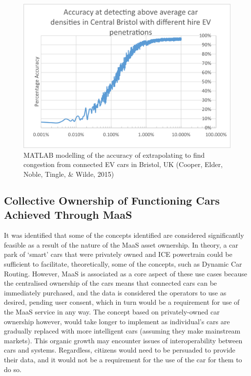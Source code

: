 \documentclass[journal]{IEEEtran}
\begin{document}
\begin{figure}[!htb]
\centering
\includegraphics[width=\columnwidth]{images/criticalresolution.png}
\caption{MATLAB modelling of the accuracy of extrapolating to find
  congestion from connected EV cars in Bristol, UK (Cooper, Elder,
  Noble, Tingle, \& Wilde, 2015)}
\label{fig:criticalresolution}
\end{figure}

\subsection{Collective Ownership of Functioning Cars Achieved Through
  MaaS}

It was identified that some of the concepts identified are considered
significantly feasible as a result of the nature of the MaaS asset
ownership. In theory, a car park of `smart' cars that were privately
owned and ICE powertrain could be sufficient to facilitate,
theoretically, some of the concepts, such as Dynamic Car
Routing. However, MaaS is associated as a core aspect of these use
cases because the centralised ownership of the cars means that
connected cars can be immediately purchased, and the data is
considered the operators to use as desired, pending user consent,
which in turn would be a requirement for use of the MaaS service in
any way. The concept based on privately-owned car ownership however,
would take longer to implement as individual's cars are gradually
replaced with more intelligent cars (assuming they make mainstream
markets). This organic growth may encounter issues of interoperability
between cars and systems. Regardless, citizens would need to be
persuaded to provide their data, and it would not be a requirement for
the use of the car for them to do so.
\end{document}
